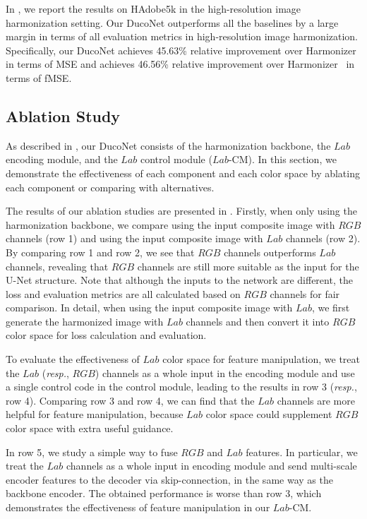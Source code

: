 \documentclass[sigconf]{acmart}
\begin{document}
In , we report the results on HAdobe5k in the high-resolution image harmonization setting.
Our DucoNet outperforms all the baselines by a large margin in terms of all evaluation metrics in high-resolution image harmonization.
Specifically, our DucoNet achieves 45.63\% relative improvement over Harmonizer~\cite{harmonizer} in terms of MSE and achieves 46.56\% relative improvement over Harmonizer~\cite{harmonizer} in terms of fMSE. 


\subsection{Ablation Study}\label{section:Ablation Study}

As described in , our DucoNet consists of the harmonization backbone, the $Lab$ encoding module, and the $Lab$ control module ($Lab$-CM). 
In this section, we demonstrate the effectiveness of each component and each color space by ablating each component or comparing with alternatives.

The results of our ablation studies are presented in . Firstly, when only using the harmonization backbone, we compare using the input composite image with $RGB$ channels (row 1) and using the input composite image with $Lab$ channels (row 2).
By comparing row 1 and row 2,  we see that $RGB$ channels outperforms $Lab$ channels, revealing that $RGB$ channels are still more suitable as the input for the U-Net structure. 
Note that although the inputs to the network are different, the loss and evaluation metrics are all calculated based on $RGB$ channels for fair comparison.
In detail, when using the input composite image with $Lab$, we first generate the harmonized image with $Lab$ channels and then convert it into $RGB$ color space for loss calculation and evaluation.

To evaluate the effectiveness of $Lab$ color space for feature manipulation, we treat the $Lab$ (\emph{resp.}, $RGB$) channels as a whole input in the encoding module and use a single control code in the control module, leading to the results in row 3 (\emph{resp.}, row 4). 
Comparing row 3 and row 4, we can find that the $Lab$ channels are more helpful for feature manipulation, because $Lab$ color space could supplement $RGB$ color space with extra useful guidance.

In row 5, we study a simple way to fuse $RGB$ and $Lab$ features. In particular, we treat the $Lab$ channels as a whole input in encoding module and send multi-scale encoder features to the decoder via skip-connection, in the same way as the backbone encoder. The obtained performance is worse than row 3,  which demonstrates the effectiveness of feature manipulation in our $Lab$-CM.
\end{document}

